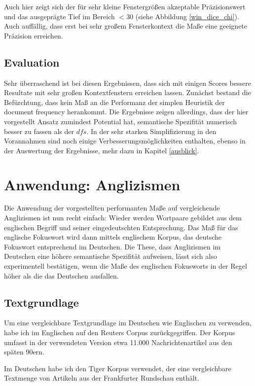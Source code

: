 \documentclass[11pt,numbers=noenddot]{scrartcl}
\begin{document}
Auch hier zeigt sich der für sehr kleine Fenstergrößen akzeptable Präzisionswert und das ausgeprägte Tief im Bereich $<30$ (siehe Abbildung \ref{win_dice_chi}). Auch auffällig, dass erst bei sehr großem Fensterkontext die Maße eine geeignete Präzision erreichen.


\subsection{Evaluation}

Sehr überraschend ist bei diesen Ergebnissen, dass sich mit einigen Scores bessere Resultate mit sehr großen Kontextfenstern erreichen lassen. Zunächst bestand die Befürchtung, dass kein Maß an die Performanz der simplen Heuristik der document frequency herankommt. Die Ergebnisse zeigen allerdings, dass der hier vorgestellt Ansatz zumindest Potential hat, semantische Spezifität numerisch besser zu fassen als der $dfs$. In der sehr starken Simplifizierung in den Vorannahmen sind noch einige Verbesserungsmöglichkeiten enthalten, ebenso in der Auswertung der Ergebnisse, mehr dazu in Kapitel \ref{ausblick}.

\section{Anwendung: Anglizismen}

Die Anwendung der vorgestellten performanten Maße auf vergleichende Anglizismen ist nun recht einfach: Wieder werden Wortpaare gebildet aus dem englischen Begriff und seiner eingedeutschten Entsprechung. Das Maß für das englische Fokuswort wird dann mittels englischem Korpus, das deutsche Fokuswort entsprechend im Deutschen. Die These, dass Anglizismen im Deutschen eine höhere semantische Spezifität aufweisen, lässt sich also experimentell bestätigen, wenn die Maße des englischen Fokusworts in der Regel höher als die das Deutschen ausfallen.

\subsection{Textgrundlage}

Um eine vergleichbare Textgrundlage im Deutschen wie Englischen zu verwenden, habe ich im Englischen auf den Reuters Corpus \citep{Lewis:2004:RNB:1005332.1005345} zurückgegriffen. Der Korpus umfasst in der verwendeten Version etwa 11.000 Nachrichtenartikel aus den späten 90ern.

Im Deutschen habe ich den Tiger Korpus \citep{Brants2004} verwendet, der eine vergleichbare Textmenge von Artikeln aus der Frankfurter Rundschau enthält.
\end{document}
